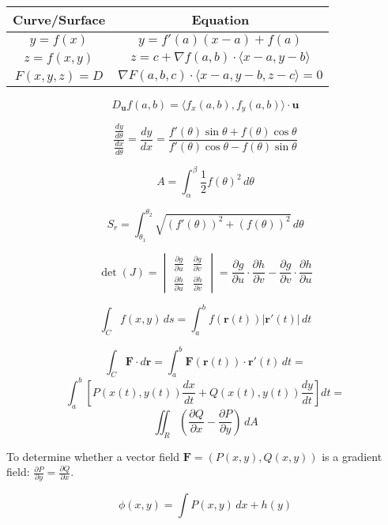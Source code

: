 \documentclass{report}
\begin{document}
\begin{multicols}{2}
	\begin{tabular}{|c|c|}
		\hline
		\textbf{Curve/Surface} & \textbf{Equation}                                                     \\
		\hline
		\( y = f(x) \)         & \( y = f'(a)(x - a) + f(a) \)                                         \\
		\( z = f(x, y) \)      & \( z = c + \nabla f(a, b) \cdot \langle x - a, y - b \rangle \)       \\
		\( F(x, y, z) = D \)   & \( \nabla F(a, b, c) \cdot \langle x - a, y - b, z - c \rangle = 0 \) \\
		\hline
	\end{tabular}

	\[
		D_{\mathbf{u}} f(a, b) = \langle f_x(a, b), f_y(a, b) \rangle \cdot \mathbf{u}
	\]

	\[
		\frac{\frac{dy}{d\theta}}{\frac{dx}{d\theta}} = \frac{dy}{dx} = \frac{f'(\theta) \sin \theta + f(\theta) \cos \theta}{f'(\theta) \cos \theta - f(\theta) \sin \theta}
	\]

	\[
		A = \int_{\alpha}^{\beta} \frac{1}{2} f(\theta)^2 \, d\theta
	\]

	\[
		S_r = \int_{\theta_1}^{\theta_2} \sqrt{\left(f'(\theta)\right)^2 + \left(f(\theta)\right)^2} \, d\theta
	\]

	\[
		\det(J) =
		\begin{vmatrix}
			\frac{\partial g}{\partial u} & \frac{\partial g}{\partial v} \\
			\frac{\partial h}{\partial u} & \frac{\partial h}{\partial v}
		\end{vmatrix}
		= \frac{\partial g}{\partial u} \cdot \frac{\partial h}{\partial v} - \frac{\partial g}{\partial v} \cdot \frac{\partial h}{\partial u}
	\]

	\[
		\int_C f(x, y) \, ds = \int_a^b f(\mathbf{r}(t)) |\mathbf{r}'(t)| \, dt
	\]

	\[
		\int_C \mathbf{F} \cdot d\mathbf{r} = \int_a^b \mathbf{F}(\mathbf{r}(t)) \cdot \mathbf{r}'(t) \, dt =
	\]
	\[
		\int_a^b \left[ P(x(t), y(t)) \frac{dx}{dt} + Q(x(t), y(t)) \frac{dy}{dt} \right] dt =
	\]
	\[
		\iint_R \left( \frac{\partial Q}{\partial x} - \frac{\partial P}{\partial y} \right) \, dA
	\]

	To determine whether a vector field \( \mathbf{F} = (P(x, y), Q(x, y)) \) is a gradient field: \( \frac{\partial P}{\partial y} = \frac{\partial Q}{\partial x} \).

	\[
		\phi(x, y) = \int P(x, y) \, dx + h(y)
	\]


\end{multicols}
\end{document}
